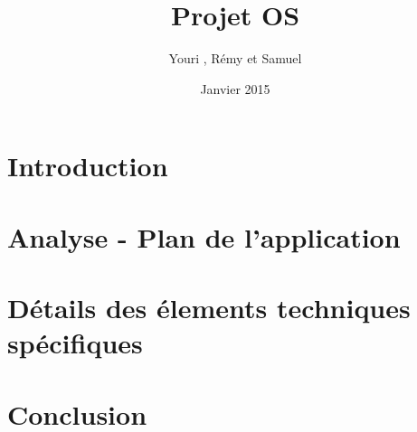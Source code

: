 \documentclass{report}
\title{Projet OS}
\author{Youri \bsc{Mouton}, Rémy \bsc{Voet} et Samuel \bsc{Monroe}}
\date{Janvier 2015}
\begin{document}
\maketitle
\part{Introduction}
\part{Analyse - Plan de l'application}
\part{Détails des élements techniques spécifiques}
\part{Conclusion}
\end{document}
